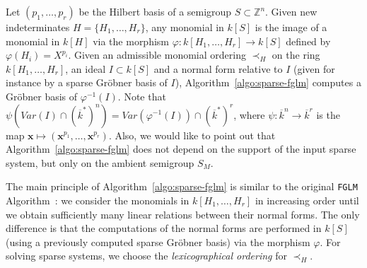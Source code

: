 \documentclass[12pt]{article}
\numberwithin{equation}{section}
\numberwithin{theorem}{section}
\newcommand{\Z}{\mathbb{Z}}
\newcommand{\sgp}{S}
\begin{document}
Let $(p_1,\dots,p_r)$ be the Hilbert basis of a semigroup
$\sgp\subset\Z^n$. Given new indeterminates $H=\{H_1,\dots,H_r\}$, any
monomial in $k[\sgp]$ is the image of a monomial in $k[H]$ via the morphism
$\varphi:k[H_1,\dots,H_r]\rightarrow k[\sgp]$ defined by
$\varphi(H_i)=X^{p_i}$. Given an admissible monomial ordering $\prec_H$ on the ring $k[H_1,\dots,H_r]$,
an ideal $I\subset k[\sgp]$ and a normal form relative to $I$ (given for
instance by a sparse Gr\"obner basis of $I$),
Algorithm~\ref{algo:sparse-fglm} computes a Gr\"obner basis of
$\varphi^{-1}(I)$. Note that $\psi\left(Var(I)\cap
(\overline k^*)^n\right)=Var\left(\varphi^{-1}(I)\right)\cap (\overline
k^*)^r$, where $\psi: \overline k^n\rightarrow \overline k^r$ is the map $\mathbf x\mapsto (\mathbf x^{p_1},\ldots,\mathbf x^{p_r})$. Also, we would like to point out that 
Algorithm~\ref{algo:sparse-fglm} does not depend on the support of the
input sparse system, but only on the ambient semigroup $S_M$.

The main principle of Algorithm~\ref{algo:sparse-fglm} is similar to
the original {\tt FGLM} Algorithm~\cite{FGLM}: we consider the monomials in
$k[H_1,\ldots,H_r]$ in increasing order until we obtain sufficiently
many linear relations between their normal forms. The only difference
is that the computations of the normal forms are performed in
$k[\sgp]$ (using a previously computed sparse Gr\"obner basis) via the
morphism $\varphi$. For solving sparse systems, we choose
the \emph{lexicographical ordering} for $\prec_H$.
\end{document}
